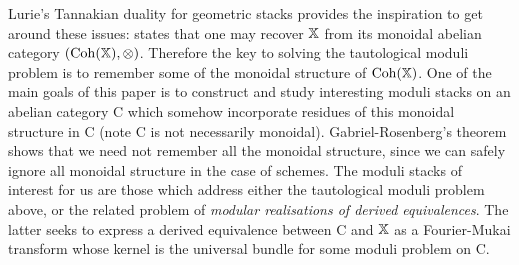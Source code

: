 \documentclass[12pt]{amsart}
\begin{document}
Lurie's Tannakian duality for geometric stacks \cite{Lurie} provides the inspiration to get around these issues: \cite[Theorem 5.11]{Lurie} states that one may recover $\mathbb{X}$ from its monoidal abelian category $(\operatorname{Coh}(\mathbb{X}), \otimes)$. Therefore the key to solving the tautological moduli problem is to remember some of the monoidal structure of  $\operatorname{Coh}(\mathbb{X})$. One of the main goals of this paper is to construct and study interesting moduli stacks on an abelian category {\sf C} which somehow incorporate residues of this monoidal structure in {\sf C} (note {\sf C} is not necessarily monoidal). Gabriel-Rosenberg's theorem shows that we need not remember all the monoidal structure, since we can safely ignore all monoidal structure in the case of schemes. The moduli stacks of interest for us are those which address either the tautological moduli problem above, or the related problem of {\em modular realisations of derived equivalences}. The latter seeks to express a derived equivalence between {\sf C} and $\mathbb{X}$ as a Fourier-Mukai transform whose kernel is the universal bundle for some moduli problem on {\sf C}. 

\end{document}
